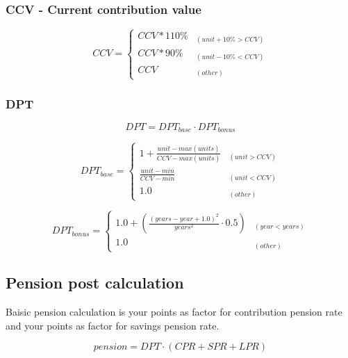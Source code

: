 \subsubsection*{CCV - Current contribution value}

\begin{equation*}
CCV = \begin{cases} 
CCV * 110\% & _{(unit+10\% > CCV)} \\
CCV * 90\% & _{(unit-10\% < CCV)} \\
CCV & _{(other)}
\end{cases}
\end{equation*}

\subsubsection*{DPT}

\begin{equation*}
DPT = DPT_{base} \cdot DPT_{bonus}
\end{equation*}

\begin{equation*}
DPT_{base} = \begin{cases} 
1 + \frac{unit-max(units)} {CCV - max(units)} 
  & _{(unit > CCV)} \\
\frac{unit - min} {CCV - min} 
  & _{(unit < CCV)} \\
1.0 & _{(other)}
\end{cases}
\end{equation*}

\begin{equation*}
DPT_{bonus} = \begin{cases} 
1.0 + (\frac{(years - year + 1.0)^2}
      {years^2} \cdot 0.5) & _{(year < years)} \\
1.0 & _{(other)} 
\end{cases}
\end{equation*}


\newpage

\subsection{Pension post calculation}

Baisic pension calculation is your points
as factor for contribution pension rate and 
your points as factor for savings pension rate.

\begin{equation*}
pension = DPT \cdot (CPR + SPR + LPR)
\end{equation*}

